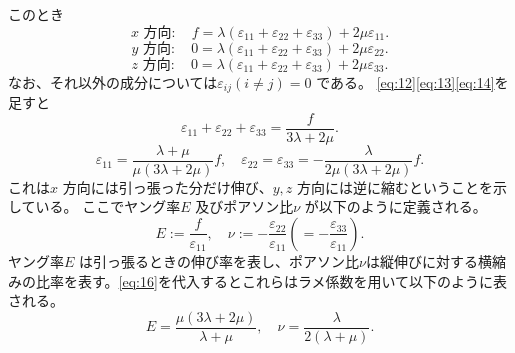 \documentclass[dvipdfmx,11pt]{jsreport}
\numberwithin{equation}{chapter}
\numberwithin{table}{chapter}
\begin{document}
このとき
\begin{equation}
\label{eq:12}
	\text{$x$ 方向}:\quad f=\lambda(\varepsilon_{11}+\varepsilon_{22}+\varepsilon_{33})+2\mu \varepsilon_{11}
.\end{equation}
\begin{equation}
\label{eq:13}
	\text{$y$ 方向}:\quad 0=\lambda(\varepsilon_{11}+\varepsilon_{22}+\varepsilon_{33})+2\mu \varepsilon_{22}
.\end{equation}
\begin{equation}
\label{eq:14}
	\text{$z$ 方向}:\quad 0=\lambda(\varepsilon_{11}+\varepsilon_{22}+\varepsilon_{33})+2\mu \varepsilon_{33}
.\end{equation}
なお、それ以外の成分については$\varepsilon_{ij}(i\neq j)=0$ である。
\eqref{eq:12}\eqref{eq:13}\eqref{eq:14}を足すと
\begin{equation}
\label{eq:15}
	\varepsilon_{11}+\varepsilon_{22}+\varepsilon_{33}=\frac{f}{3\lambda+2\mu}
.\end{equation}
\begin{equation}
\label{eq:16}
	\varepsilon_{11}=\frac{\lambda+\mu}{\mu(3\lambda+2\mu)}f,\quad \varepsilon_{22}=\varepsilon_{33}=-\frac{\lambda}{2\mu(3\lambda+2\mu)}f
.\end{equation}
これは$x$ 方向には引っ張った分だけ伸び、$y,z$ 方向には逆に縮むということを示している。
ここでヤング率$E$ 及びポアソン比$\nu$ が以下のように定義される。
\begin{equation}
\label{eq:17}
	E:=\frac{f}{\varepsilon_{11}},\quad \nu:=-\frac{\varepsilon_{22}}{\varepsilon_{11}}\left( =-\frac{\varepsilon_{33}}{\varepsilon_{11}} \right) 
.\end{equation}
ヤング率$E$ は引っ張るときの伸び率を表し、ポアソン比$\nu$は縦伸びに対する横縮みの比率を表す。\eqref{eq:16}を代入するとこれらはラメ係数を用いて以下のように表される。
\begin{equation}
\label{eq:18}
	E=\frac{\mu(3\lambda+2\mu)}{\lambda+\mu},\quad \nu=\frac{\lambda}{2(\lambda+\mu)}
.\end{equation}
\end{document}
